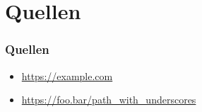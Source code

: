 \section{Quellen}
\begin{frame}
    \transwipe
    \frametitle{Quellen}

    \begin{itemize}
        \item \url{https://example.com}
        \item \url{https://foo.bar/path_with_underscores}
    \end{itemize}
\end{frame}
